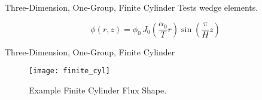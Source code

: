 \begin{frame}{Three-Dimension, One-Group, Finite Cylinder}
  Tests wedge elements.
  \begin{table}
    \label{tab:finite_cyl}
    \begin{center}
    \end{center}
  \end{table}
  \begin{equation}
    \label{eq:analytic_finite_cyl}
    \phi(r,z) = \phi_0 \, 
      J_0\left(\frac{\alpha_0}{T} r\right) \sin\left(\frac{\pi}{H} z \right)
  \end{equation}
\end{frame}

\begin{frame}{Three-Dimension, One-Group, Finite Cylinder}
  \begin{figure}
    \centering
    \texttt{[image: finite\_cyl]}
    \caption{Example Finite Cylinder Flux Shape.}
    \label{fig:finite_cyl}
  \end{figure}
\end{frame}

